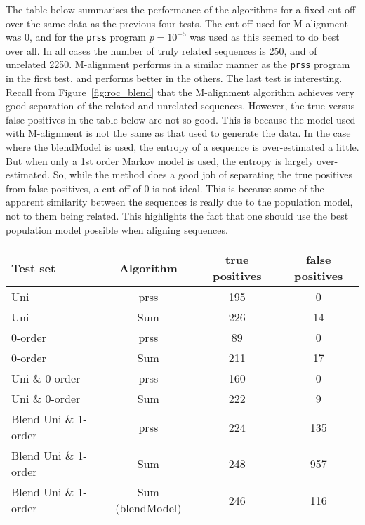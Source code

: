 \documentclass[letterpaper,11pt,oneside]{article}
\begin{document}
The table below summarises the performance of the algorithms for a fixed
cut-off over the same data as the previous four tests.  The cut-off used for
M-alignment was 0, and for the \verb!prss! program $p=10^{-5}$ was used as
this seemed to do best over all.  In all cases the number of truly related
sequences is 250, and of unrelated 2250.  M-alignment performs in a similar
manner as the \verb!prss! program in the first test, and performs better in
the others.  The last test is interesting.  Recall from
Figure~\ref{fig:roc_blend} that the M-alignment algorithm achieves very good
separation of the related and unrelated sequences.  However, the true versus
false positives in the table below are not so good.  This is because the model
used with M-alignment is not the same as that used to generate the data.  In
the case where the blendModel is used, the entropy of a sequence is
over-estimated a little.  But when only a 1st order Markov model is used, the
entropy is largely over-estimated.  So, while the method does a good job of
separating the true positives from false positives, a cut-off of 0 is not
ideal.  This is because some of the apparent similarity between the sequences
is really due to the population model, not to them being related.  This
highlights the fact that one should use the best population model possible
when aligning sequences.

\begin{minipage}{\textwidth}
\footnotesize
\begin{tabular}{|l|c||c|c|} \hline
Test set & Algorithm & true positives & false positives \\ \hline
Uni &  prss & 195 & 0  \\ 
Uni & Sum & 226 & 14  \\ \hline

0-order & prss & 89 & 0  \\ 
0-order & Sum & 211 & 17  \\ \hline

Uni \& 0-order & prss & 160 & 0  \\ 
Uni \& 0-order & Sum & 222 & 9  \\  \hline

Blend Uni \& 1-order & prss & 224 & 135  \\ 
Blend Uni \& 1-order & Sum & 248 & 957 \\ 
Blend Uni \& 1-order & Sum (blendModel) & 246 & 116 \\ 
\hline \end{tabular}
\end{minipage}
\end{document}
